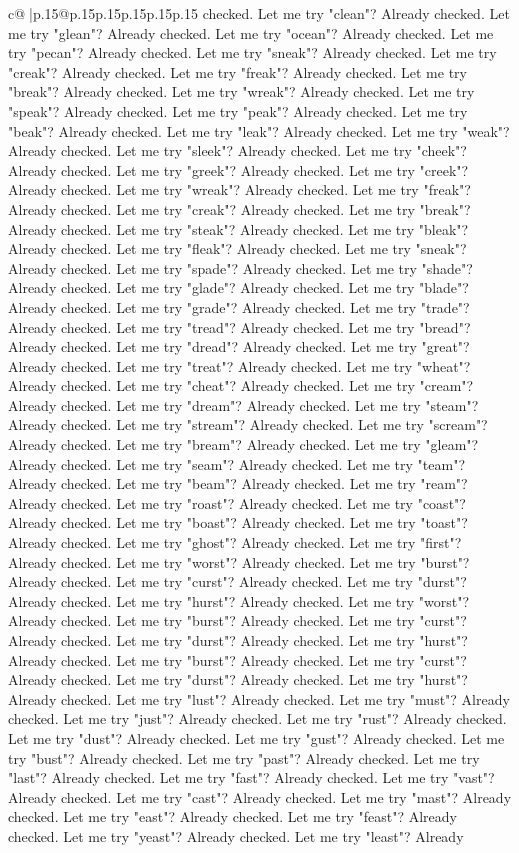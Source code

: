 \documentclass{article}
\begin{document}
{\begin{supertabular}{c@{$\;$}|p{.15\linewidth}@{}p{.15\linewidth}p{.15\linewidth}p{.15\linewidth}p{.15\linewidth}p{.15\linewidth}}
{{{checked. Let me try "clean"? Already checked. Let me try "glean"? Already checked. Let me try "ocean"? Already checked. Let me try "pecan"? Already checked. Let me try "sneak"? Already checked. Let me try "creak"? Already checked. Let me try "freak"? Already checked. Let me try "break"? Already checked. Let me try "wreak"? Already checked. Let me try "speak"? Already checked. Let me try "peak"? Already checked. Let me try "beak"? Already checked. Let me try "leak"? Already checked. Let me try "weak"? Already checked. Let me try "sleek"? Already checked. Let me try "cheek"? Already checked. Let me try "greek"? Already checked. Let me try "creek"? Already checked. Let me try "wreak"? Already checked. Let me try "freak"? Already checked. Let me try "creak"? Already checked. Let me try "break"? Already checked. Let me try "steak"? Already checked. Let me try "bleak"? Already checked. Let me try "fleak"? Already checked. Let me try "sneak"? Already checked. Let me try "spade"? Already checked. Let me try "shade"? Already checked. Let me try "glade"? Already checked. Let me try "blade"? Already checked. Let me try "grade"? Already checked. Let me try "trade"? Already checked. Let me try "tread"? Already checked. Let me try "bread"? Already checked. Let me try "dread"? Already checked. Let me try "great"? Already checked. Let me try "treat"? Already checked. Let me try "wheat"? Already checked. Let me try "cheat"? Already checked. Let me try "cream"? Already checked. Let me try "dream"? Already checked. Let me try "steam"? Already checked. Let me try "stream"? Already checked. Let me try "scream"? Already checked. Let me try "bream"? Already checked. Let me try "gleam"? Already checked. Let me try "seam"? Already checked. Let me try "team"? Already checked. Let me try "beam"? Already checked. Let me try "ream"? Already checked. Let me try "roast"? Already checked. Let me try "coast"? Already checked. Let me try "boast"? Already checked. Let me try "toast"? Already checked. Let me try "ghost"? Already checked. Let me try "first"? Already checked. Let me try "worst"? Already checked. Let me try "burst"? Already checked. Let me try "curst"? Already checked. Let me try "durst"? Already checked. Let me try "hurst"? Already checked. Let me try "worst"? Already checked. Let me try "burst"? Already checked. Let me try "curst"? Already checked. Let me try "durst"? Already checked. Let me try "hurst"? Already checked. Let me try "burst"? Already checked. Let me try "curst"? Already checked. Let me try "durst"? Already checked. Let me try "hurst"? Already checked. Let me try "lust"? Already checked. Let me try "must"? Already checked. Let me try "just"? Already checked. Let me try "rust"? Already checked. Let me try "dust"? Already checked. Let me try "gust"? Already checked. Let me try "bust"? Already checked. Let me try "past"? Already checked. Let me try "last"? Already checked. Let me try "fast"? Already checked. Let me try "vast"? Already checked. Let me try "cast"? Already checked. Let me try "mast"? Already checked. Let me try "east"? Already checked. Let me try "feast"? Already checked. Let me try "yeast"? Already checked. Let me try "least"? Already }}}
\end{supertabular}}
\end{document}
